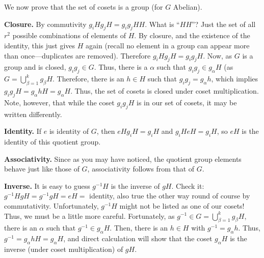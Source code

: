 \documentclass[12pt,letterpaper]{article}
\begin{document}
We now prove that the set of cosets is a group (for $G$ Abelian).


{\bf Closure.} By commutivity $g_i H g_j H = g_i g_j H H$. What is
``$H H$''? Just the set of all $r^2$ possible combinations of
elements of $H$. By closure, and the existence of the identity,
this just gives $H$ again (recall no element in a group can appear
more than once---duplicates are removed). Therefore $g_i H g_j H =
g_i g_j H$. Now, as $G$ is a group and is closed, $g_i g_j \in G$.
Thus, there is a $\alpha$ such that $g_i g_j \in g_\alpha H$ (as
$G = \bigcup_{\beta=1}^k g_\beta H$. Therefore, there is an $h \in
H$ such that $g_i g_j = g_\alpha h$, which implies $g_i g_j H =
g_\alpha h H = g_\alpha H$. Thus, the set of cosets is closed
under coset multiplication. Note, however, that while the coset
$g_i g_j H$ is in our set of cosets, it may be written
differently.

{\bf Identity.} If $e$ is identity of $G$, then $eH g_i H = g_i H$
and $g_i H eH = g_i H$, so $eH$ is the identity of this quotient
group.

{\bf Associativity.} Since as you may have noticed, the quotient
group elements behave just like those of $G$, associativity
follows from that of $G$.

{\bf Inverse.} It is easy to guess $g^{-1} H$ is the inverse of $g
H$. Check it: $g^{-1} H g H = g^{-1} g H = eH = $ identity, also
true the other way round of course by commutativity.
Unfortunately, $g^{-1} H$ might not be listed as one of our
cosets! Thus, we must be a little more careful. Fortunately, as
$g^{-1} \in G = \bigcup_{\beta=1}^k g_\beta H$, there is an
$\alpha$ such that $g^{-1} \in g_\alpha H$. Then, there is an $h
\in H$ with $g^{-1} = g_\alpha h$. Thus, $g^{-1} = g_\alpha h H =
g_\alpha H$, and direct calculation will show that the coset
$g_\alpha H$ is the inverse (under coset multiplication) of $g H$.
\end{document}
